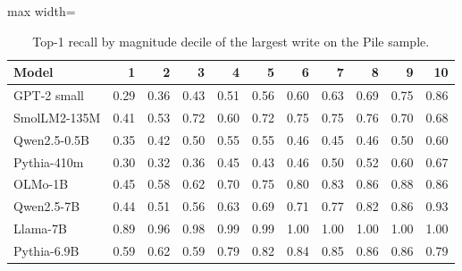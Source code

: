 \begin{table}[H]\centering\scriptsize
\caption{Top-1 recall by magnitude decile of the largest write on the Pile sample.}\label{app:recall-decile-pile}
\begin{adjustbox}{max width=\linewidth}
\begin{tabular}{lrrrrrrrrrr}\toprule
Model & 1 & 2 & 3 & 4 & 5 & 6 & 7 & 8 & 9 & 10 \\ \midrule
GPT-2 small & 0.29 & 0.36 & 0.43 & 0.51 & 0.56 & 0.60 & 0.63 & 0.69 & 0.75 & 0.86 \\
SmolLM2-135M & 0.41 & 0.53 & 0.72 & 0.60 & 0.72 & 0.75 & 0.75 & 0.76 & 0.70 & 0.68 \\
Qwen2.5-0.5B & 0.35 & 0.42 & 0.50 & 0.55 & 0.55 & 0.46 & 0.45 & 0.46 & 0.50 & 0.60 \\
Pythia-410m & 0.30 & 0.32 & 0.36 & 0.45 & 0.43 & 0.46 & 0.50 & 0.52 & 0.60 & 0.67 \\
OLMo-1B & 0.45 & 0.58 & 0.62 & 0.70 & 0.75 & 0.80 & 0.83 & 0.86 & 0.88 & 0.86 \\
Qwen2.5-7B & 0.44 & 0.51 & 0.56 & 0.63 & 0.69 & 0.71 & 0.77 & 0.82 & 0.86 & 0.93 \\
Llama-7B & 0.89 & 0.96 & 0.98 & 0.99 & 0.99 & 1.00 & 1.00 & 1.00 & 1.00 & 1.00 \\
Pythia-6.9B & 0.59 & 0.62 & 0.59 & 0.79 & 0.82 & 0.84 & 0.85 & 0.86 & 0.86 & 0.79 \\
\bottomrule\end{tabular}\end{adjustbox}
\end{table}
